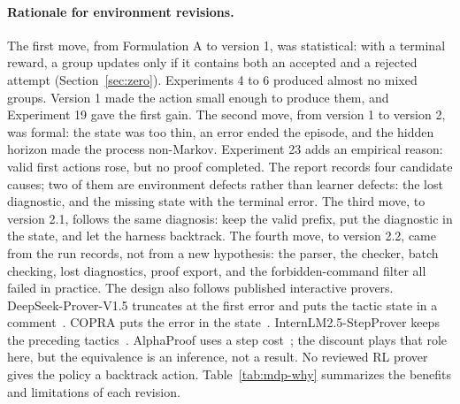 \documentclass[11pt]{article}
\begin{document}
\paragraph{Rationale for environment revisions.}
The first move, from Formulation A to version 1, was statistical: with a terminal reward, a group updates only if it contains both an accepted and a rejected attempt (Section~\ref{sec:zero}).
Experiments 4 to 6 produced almost no mixed groups.
Version 1 made the action small enough to produce them, and Experiment 19 gave the first gain.
The second move, from version 1 to version 2, was formal: the state was too thin, an error ended the episode, and the hidden horizon made the process non-Markov.
Experiment 23 adds an empirical reason: valid first actions rose, but no proof completed.
The report records four candidate causes; two of them are environment defects rather than learner defects: the lost diagnostic, and the missing state with the terminal error.
The third move, to version 2.1, follows the same diagnosis: keep the valid prefix, put the diagnostic in the state, and let the harness backtrack.
The fourth move, to version 2.2, came from the run records, not from a new hypothesis: the parser, the checker, batch checking, lost diagnostics, proof export, and the forbidden-command filter all failed in practice.
The design also follows published interactive provers.
DeepSeek-Prover-V1.5 truncates at the first error and puts the tactic state in a comment~\cite{deepseekprover15}.
COPRA puts the error in the state~\cite{copra}.
InternLM2.5-StepProver keeps the preceding tactics~\cite{internlm}.
AlphaProof uses a step cost~\cite{alphaproof}; the discount plays that role here, but the equivalence is an inference, not a result.
No reviewed RL prover gives the policy a backtrack action.
Table~\ref{tab:mdp-why} summarizes the benefits and limitations of each revision.
\end{document}
